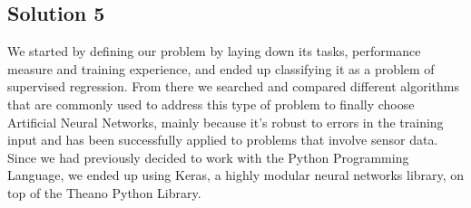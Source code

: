 \documentclass[12pt]{partialreport}
\begin{document}
\subsection*{Solution 5}
We started by defining our problem by laying down its tasks, performance measure and training experience, and ended up classifying it as a problem of supervised regression. From there we searched and compared different algorithms that are commonly used to address this type of problem to finally choose Artificial Neural Networks, mainly because it's robust to errors in the training input and has been successfully applied to problems that involve sensor data. Since we had previously decided to work with the Python Programming Language, we ended up using Keras, a highly modular neural networks library, on top of the Theano Python Library.
\end{document}
